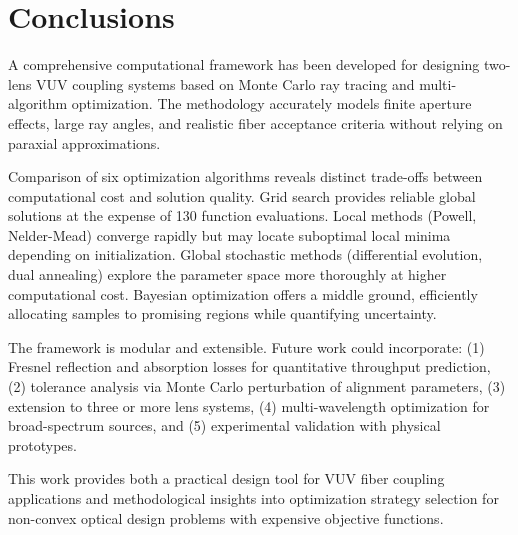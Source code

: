 \section{Conclusions}

A comprehensive computational framework has been developed for designing two-lens VUV coupling systems based on Monte Carlo ray tracing and multi-algorithm optimization. The methodology accurately models finite aperture effects, large ray angles, and realistic fiber acceptance criteria without relying on paraxial approximations.

Comparison of six optimization algorithms reveals distinct trade-offs between computational cost and solution quality. Grid search provides reliable global solutions at the expense of 130 function evaluations. Local methods (Powell, Nelder-Mead) converge rapidly but may locate suboptimal local minima depending on initialization. Global stochastic methods (differential evolution, dual annealing) explore the parameter space more thoroughly at higher computational cost. Bayesian optimization offers a middle ground, efficiently allocating samples to promising regions while quantifying uncertainty.

The framework is modular and extensible. Future work could incorporate: (1) Fresnel reflection and absorption losses for quantitative throughput prediction, (2) tolerance analysis via Monte Carlo perturbation of alignment parameters, (3) extension to three or more lens systems, (4) multi-wavelength optimization for broad-spectrum sources, and (5) experimental validation with physical prototypes.

This work provides both a practical design tool for VUV fiber coupling applications and methodological insights into optimization strategy selection for non-convex optical design problems with expensive objective functions.


